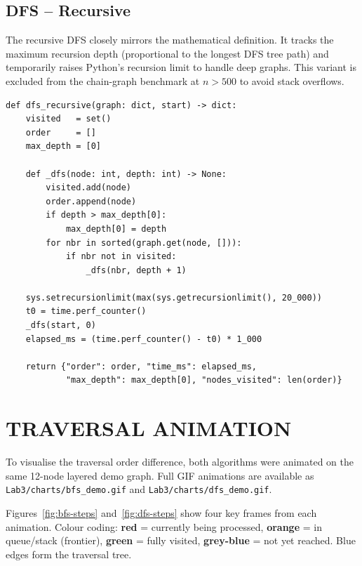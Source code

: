 \documentclass[12pt]{article}
\begin{document}
\subsection*{DFS -- Recursive}

\hspace{0.8cm} The recursive DFS closely mirrors the mathematical definition.  It
tracks the maximum recursion depth (proportional to the longest DFS tree path) and
temporarily raises Python's recursion limit to handle deep graphs.  This variant is
excluded from the chain-graph benchmark at $n > 500$ to avoid stack overflows.

\begin{lstlisting}[caption={DFS -- Recursive}, label={lst:dfs-rec}]
def dfs_recursive(graph: dict, start) -> dict:
    visited   = set()
    order     = []
    max_depth = [0]

    def _dfs(node: int, depth: int) -> None:
        visited.add(node)
        order.append(node)
        if depth > max_depth[0]:
            max_depth[0] = depth
        for nbr in sorted(graph.get(node, [])):
            if nbr not in visited:
                _dfs(nbr, depth + 1)

    sys.setrecursionlimit(max(sys.getrecursionlimit(), 20_000))
    t0 = time.perf_counter()
    _dfs(start, 0)
    elapsed_ms = (time.perf_counter() - t0) * 1_000

    return {"order": order, "time_ms": elapsed_ms,
            "max_depth": max_depth[0], "nodes_visited": len(order)}
\end{lstlisting}

\section*{TRAVERSAL ANIMATION}

\hspace{0.8cm} To visualise the traversal order difference, both algorithms were
animated on the same 12-node layered demo graph.
Full GIF animations are available as \texttt{Lab3/charts/bfs\_demo.gif} and
\texttt{Lab3/charts/dfs\_demo.gif}.

Figures~\ref{fig:bfs-steps} and~\ref{fig:dfs-steps} show four key frames from each
animation. Colour coding: \textbf{red} = currently being processed, \textbf{orange} =
in queue/stack (frontier), \textbf{green} = fully visited, \textbf{grey-blue} = not
yet reached. Blue edges form the traversal tree.
\end{document}
